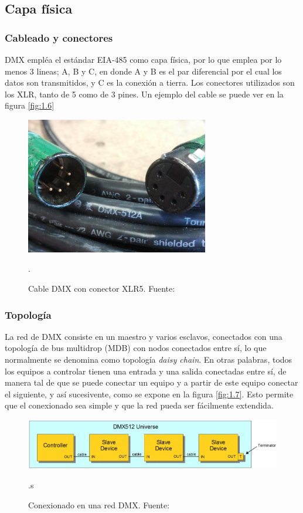 \subsection{Capa física}
\subsubsection{Cableado y conectores}
DMX empléa el estándar EIA-485 como capa física, por lo que emplea por lo menos 3 lineas; A, B y C, en donde A y B es el par diferencial por el cual los datos son transmitidos, y C es la conexión a tierra. Los conectores utilizados son los XLR, tanto de 5 como de 3 pines. Un ejemplo del cable se puede ver en la figura \ref{fig:1.6} \\

\begin{figure}[!ht]
	\centering
	\includegraphics[width=8cm,scale=1]{resources/1_6-cableDMX.jpg}
	\caption{Cable DMX con conector XLR5. Fuente: \cite{fig1_6}}.
	\label{fig:\thefigure}
\end{figure}

\subsubsection{Topología}
La red de DMX consiste en un maestro y varios esclavos, conectados con una topología de bus multidrop (MDB) con nodos conectados entre sí, lo que normalmente se denomina como topología \textit{daisy chain}. En otras palabras, todos los equipos a controlar tienen una entrada y una salida conectadas entre sí, de manera tal de que se puede conectar un equipo y a partir de este equipo conectar el siguiente, y así sucesivente, como se expone en la figura \ref{fig:1.7}. Esto permite que el conexionado sea simple y que la red pueda ser fácilmente extendida.

\begin{figure}[!ht]
	\centering
	\includegraphics[width=15cm,scale=1]{resources/1_7-topologiaDMX.png}
	\caption{Conexionado en una red DMX. Fuente: \cite{fig1_7}}.s
	\label{fig:\thefigure}
\end{figure}

